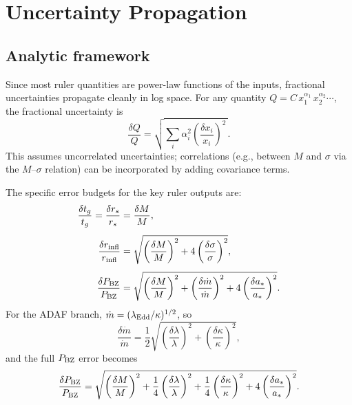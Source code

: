 \documentclass[11pt]{article}
\begin{document}
\section{Uncertainty Propagation}\label{sec:uncertainties}

\subsection{Analytic framework}

Since most ruler quantities are power-law functions of the inputs, fractional uncertainties propagate cleanly in log space.
For any quantity $Q = C\,x_1^{\alpha_1}\,x_2^{\alpha_2}\cdots$, the fractional uncertainty is
\begin{equation}
\frac{\delta Q}{Q} = \sqrt{\sum_i \alpha_i^2\left(\frac{\delta x_i}{x_i}\right)^2\,}.\label{eq:error_general}
\end{equation}
This assumes uncorrelated uncertainties; correlations (e.g., between $M$ and $\sigma$ via the $M$--$\sigma$ relation) can be incorporated by adding covariance terms.

The specific error budgets for the key ruler outputs are:
\begin{align}
\frac{\delta t_g}{t_g} = \frac{\delta r_s}{r_s} &= \frac{\delta M}{M}, \label{eq:err_tg}\\[4pt]
\frac{\delta r_{\rm infl}}{r_{\rm infl}} &= \sqrt{\left(\frac{\delta M}{M}\right)^2 + 4\left(\frac{\delta\sigma}{\sigma}\right)^2}, \label{eq:err_rinfl2}\\[4pt]
\frac{\delta P_{\rm BZ}}{P_{\rm BZ}} &= \sqrt{\left(\frac{\delta M}{M}\right)^2 + \left(\frac{\delta\dot{m}}{\dot{m}}\right)^2 + 4\left(\frac{\delta a_*}{a_*}\right)^2}. \label{eq:err_PBZ}
\end{align}
For the ADAF branch, $\dot{m}=(\lambda_{\rm Edd}/\kappa)^{1/2}$, so
\begin{equation}
\frac{\delta\dot{m}}{\dot{m}} = \frac{1}{2}\sqrt{\left(\frac{\delta\lambda}{\lambda}\right)^2+\left(\frac{\delta\kappa}{\kappa}\right)^2},
\end{equation}
and the full $P_{\rm BZ}$ error becomes
\begin{equation}
\frac{\delta P_{\rm BZ}}{P_{\rm BZ}} = \sqrt{\left(\frac{\delta M}{M}\right)^2 + \frac{1}{4}\left(\frac{\delta\lambda}{\lambda}\right)^2 + \frac{1}{4}\left(\frac{\delta\kappa}{\kappa}\right)^2 + 4\left(\frac{\delta a_*}{a_*}\right)^2}.\label{eq:err_PBZ_adaf}
\end{equation}
\end{document}
